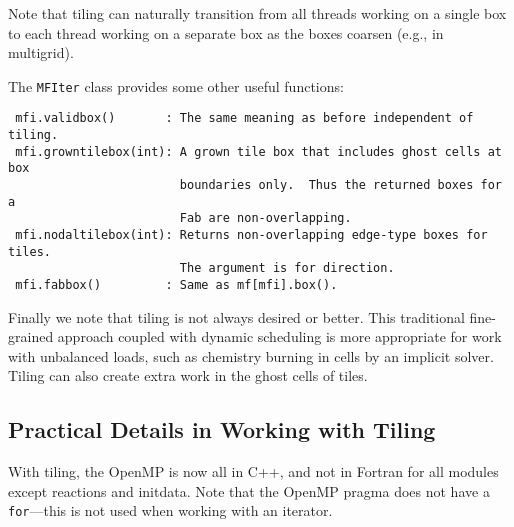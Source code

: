 Note that tiling can naturally transition from all threads working
on a single box to each thread working on a separate box as the boxes
coarsen (e.g., in multigrid).

The {\tt MFIter} class provides some other useful functions:
\begin{lstlisting}
 mfi.validbox()       : The same meaning as before independent of tiling.
 mfi.growntilebox(int): A grown tile box that includes ghost cells at box
                        boundaries only.  Thus the returned boxes for a
                        Fab are non-overlapping.
 mfi.nodaltilebox(int): Returns non-overlapping edge-type boxes for tiles.
                        The argument is for direction.
 mfi.fabbox()         : Same as mf[mfi].box().
\end{lstlisting}

Finally we note that tiling is not always desired or better.  This
traditional fine-grained approach coupled with dynamic scheduling is
more appropriate for work with unbalanced loads, such as chemistry
burning in cells by an implicit solver.  Tiling can also create extra
work in the ghost cells of tiles.


\subsection{Practical Details in Working with Tiling}

With tiling, the OpenMP is now all in C++, and not in Fortran for all
modules except reactions and initdata.  Note that the OpenMP pragma
does not have a {\tt for}---this is not used when working with an
iterator.

